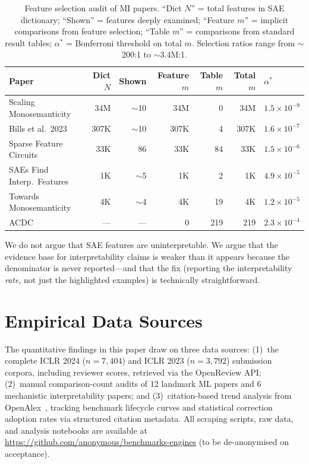 \documentclass{article}
\begin{document}
\begin{table}[h]
\centering
\caption{Feature selection audit of MI papers. ``Dict $N$'' = total features in SAE dictionary; ``Shown'' = features deeply examined; ``Feature $m$'' = implicit comparisons from feature selection; ``Table $m$'' = comparisons from standard result tables; $\alpha^*$ = Bonferroni threshold on total $m$. Selection ratios range from $\sim$200:1 to $\sim$3.4M:1.}
\label{tab:mi_audit}
\small
\begin{tabular}{@{}lrrrrrl@{}}
\toprule
Paper & Dict $N$ & Shown & Feature $m$ & Table $m$ & Total $m$ & $\alpha^*$ \\
\midrule
Scaling Monosemanticity & 34M & $\sim$10 & 34M & 0 & 34M & $1.5 \times 10^{-9}$ \\
Bills et al.\ 2023 & 307K & $\sim$10 & 307K & 4 & 307K & $1.6 \times 10^{-7}$ \\
Sparse Feature Circuits & 33K & 86 & 33K & 84 & 33K & $1.5 \times 10^{-6}$ \\
SAEs Find Interp.\ Features & 1K & $\sim$5 & 1K & 2 & 1K & $4.9 \times 10^{-5}$ \\
Towards Monosemanticity & 4K & $\sim$4 & 4K & 19 & 4K & $1.2 \times 10^{-5}$ \\
ACDC & --- & --- & 0 & 219 & 219 & $2.3 \times 10^{-4}$ \\
\bottomrule
\end{tabular}
\end{table}

We do not argue that SAE features are uninterpretable. We argue that the evidence base for interpretability claims is weaker than it appears because the denominator is never reported---and that the fix (reporting the interpretability \textit{rate}, not just the highlighted examples) is technically straightforward.

\section{Empirical Data Sources}
\label{app:data}

The quantitative findings in this paper draw on three data sources: (1)~the complete ICLR 2024 ($n = 7{,}404$) and ICLR 2023 ($n = 3{,}792$) submission corpora, including reviewer scores, retrieved via the OpenReview API; (2)~manual comparison-count audits of 12 landmark ML papers and 6 mechanistic interpretability papers; and (3)~citation-based trend analysis from OpenAlex~\citep{priem_openalex_2022}, tracking benchmark lifecycle curves and statistical correction adoption rates via structured citation metadata. All scraping scripts, raw data, and analysis notebooks are available at \url{https://github.com/anonymous/benchmarks-engines} (to be de-anonymised on acceptance).
\end{document}
